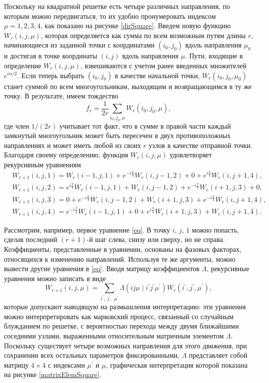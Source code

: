 Поскольку на квадратной решетке есть четыре различных направления, по которым можно передвигаться, то их удобно пронумеровать индексом $\mu = 1, 2, 3, 4$, как показано на рисунке \ref{dirSquare}. Введем новую функцию $W_r (i, j, \mu)$, которая определяется как сумма по всем возможным путям длины $r$, начинающиеся из заданной точки с координатами $(i_0, j_0)$ вдоль направления $\mu_0$ и достигая в точке координаты $(i, j)$ вдоль направления $\mu$. Пути, входящие в определение $W_r (i, j, \mu)$, взвешиваются с учетом ранее введенных множителей $e^{i\alpha / 2}$. Если теперь выбрать $(i_0, j_0)$ в качестве начальной точки, $W_r (i_0, j_0, \mu_0)$ станет суммой по всем многоугольникам, выходящим и возвращающимся в ту же точку. В результате, имеем тождество
\begin{equation}
f_{r} = \frac{1}{2r} \sum_{i_0, j_0, \mu} W_r (i_0, j_0, \mu),
\label{fl}
\end{equation}
где член $1 / (2r)$ учитывает тот факт, что в сумме в правой части каждый замкнутый многоугольник может быть пересечен в двух противоположных направлениях и может иметь любой из своих $r$ узлов в качестве отправной точки. Благодаря своему определению, функция $W_r (i, j, \mu)$ удовлетворяет рекурсивным уравнениям
\begin{align}
&W_{r+1} (i, j, 1) = W_r (i − 1, j, 1) + e^{−i \frac{\pi}{4}} W_r (i, j − 1, 2) + 0 + e^{i \frac{\pi}{4}} W_r (i, j + 1, 4), \nonumber \\
&W_{r+1} (i, j, 2) = e^{i \frac{\pi}{4}} W_r (i − 1, j, 1) + W_r (i, j − 1, 2) + e^{−i \frac{\pi}{4}} W_r (i + 1, j, 3) + 0, \nonumber\\
& W_{r+1} (i, j, 3) = 0 + e^{−i \frac{\pi}{4}} W_r (i, j − 1, 2) + W_r (i + 1, j, 3) + e^{-i\frac{\pi}{4}} W_r (i, j + 1, 4), \nonumber\\
& W_{r+1} (i, j, 4) = e^{−i \frac{\pi}{4}} W_r (i − 1, j, 1) + 0 + e^{i \frac{\pi}{4}} W_r (i + 1, j, 3) + W_r (i, j + 1, 4).
\label{eq}
\end{align}

Рассмотрим, например, первое уравнение \eqref{eq}. В точку $i$, $j$, $1$ можно попасть, сделав последний $(r + 1)$-й шаг слева, снизу или сверху, но не справа. Коэффициенты, представленные в уравнении, основаны на фазовых факторах, относящихся к изменению направлений. Используя те же аргументы, можно вывести другие уравнения в \eqref{eq}. Вводя матрицу коэффициентов $\Lambda$, рекурсивные уравнения можно записать в виде
\begin{equation}
W_{r+1}(i, j, \mu) = \sum_{i^{'},\; j^{'},\; \mu^{'}} \Lambda (ij\mu\; |\; i^{'}j^{'}\mu^{'}) W_{r} (i^{'}, j^{'}, \mu^{'}),
\end{equation}
которые допускают наводящую на размышления интерпретацию: эти уравнения можно интерпретировать как марковский процесс, связанный со случайным блужданием по решетке, с вероятностью перехода между двумя ближайшими соседними узлами, выраженными относительным матричным элементом $\Lambda$. Поскольку существует четыре возможных направления для этого движения, при сохранении всех остальных параметров фиксированными, $\Lambda$ представляет собой матрицу $4 \times 4$ с индексами $\mu^{'}$ и $\mu$, графическая интерпретация которой показана на рисунке \ref{matrixElemSquare}.

